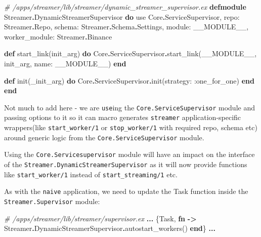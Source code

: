 \documentclass[
  oneside]{book}
\newenvironment{Shaded}{\begin{snugshade}}{\end{snugshade}}
\newcommand{\CommentTok}[1]{\textcolor[rgb]{0.56,0.35,0.01}{\textit{#1}}}
\newcommand{\ConstantTok}[1]{\textcolor[rgb]{0.00,0.00,0.00}{#1}}
\newcommand{\ImportTok}[1]{#1}
\newcommand{\KeywordTok}[1]{\textcolor[rgb]{0.13,0.29,0.53}{\textbf{#1}}}
\newcommand{\NormalTok}[1]{#1}
\newcommand{\OperatorTok}[1]{\textcolor[rgb]{0.81,0.36,0.00}{\textbf{#1}}}
\newcommand{\VariableTok}[1]{\textcolor[rgb]{0.00,0.00,0.00}{#1}}
\begin{document}
\begin{Shaded}
\begin{Highlighting}[]
\CommentTok{\# /apps/streamer/lib/streamer/dynamic\_streamer\_supervisor.ex}
\KeywordTok{defmodule} \ConstantTok{Streamer}\OperatorTok{.}\ConstantTok{DynamicStreamerSupervisor} \KeywordTok{do}
  \ImportTok{use} \ConstantTok{Core}\OperatorTok{.}\ConstantTok{ServiceSupervisor}\NormalTok{,}
    \VariableTok{repo:} \ConstantTok{Streamer}\OperatorTok{.}\ConstantTok{Repo}\NormalTok{,}
    \VariableTok{schema:} \ConstantTok{Streamer}\OperatorTok{.}\ConstantTok{Schema}\OperatorTok{.}\ConstantTok{Settings}\NormalTok{,}
    \VariableTok{module:} \ConstantTok{\_\_MODULE\_\_}\NormalTok{,}
    \VariableTok{worker\_module:} \ConstantTok{Streamer}\OperatorTok{.}\ConstantTok{Binance}

  \KeywordTok{def}\NormalTok{ start\_link(init\_arg) }\KeywordTok{do}
    \ConstantTok{Core}\OperatorTok{.}\ConstantTok{ServiceSupervisor}\OperatorTok{.}\NormalTok{start\_link(}\ConstantTok{\_\_MODULE\_\_}\NormalTok{, init\_arg, }\VariableTok{name:} \ConstantTok{\_\_MODULE\_\_}\NormalTok{)}
  \KeywordTok{end}

  \KeywordTok{def}\NormalTok{ init(\_init\_arg) }\KeywordTok{do}
    \ConstantTok{Core}\OperatorTok{.}\ConstantTok{ServiceSupervisor}\OperatorTok{.}\NormalTok{init(}\VariableTok{strategy:} \VariableTok{:one\_for\_one}\NormalTok{)}
  \KeywordTok{end}
\KeywordTok{end}
\end{Highlighting}
\end{Shaded}

Not much to add here - we are \texttt{use}ing the \texttt{Core.ServiceSupervisor} module and passing options to it so it can macro generates \texttt{streamer} application-specific wrappers(like \texttt{start\_worker/1} or \texttt{stop\_worker/1} with required repo, schema etc) around generic logic from the \texttt{Core.ServiceSupervisor} module.

Using the \texttt{Core.Servicesupervisor} module will have an impact on the interface of the \texttt{Streamer.DynamicStreamerSupervisor} as it will now provide functions like \texttt{start\_worker/1} instead of \texttt{start\_streaming/1} etc.

As with the \texttt{naive} application, we need to update the Task function inside the \texttt{Streamer.Supervisor} module:

\begin{Shaded}
\begin{Highlighting}[]
\CommentTok{\# /apps/streamer/lib/streamer/supervisor.ex}
      \OperatorTok{...}
\NormalTok{      \{}\ConstantTok{Task}\NormalTok{,}
       \KeywordTok{fn} \OperatorTok{{-}\textgreater{}}
         \ConstantTok{Streamer}\OperatorTok{.}\ConstantTok{DynamicStreamerSupervisor}\OperatorTok{.}\NormalTok{autostart\_workers()}
       \KeywordTok{end}\NormalTok{\}}
      \OperatorTok{...}
\end{Highlighting}
\end{Shaded}
\end{document}
